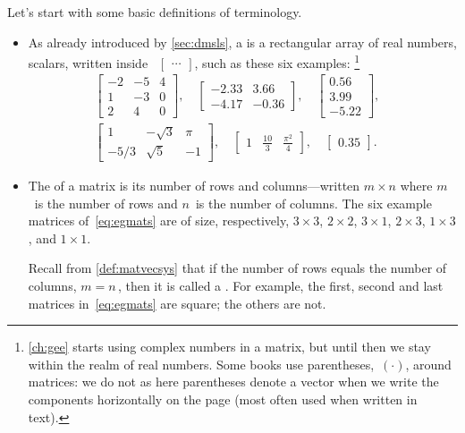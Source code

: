 Let's start with some basic definitions of terminology.
\begin{itemize}
\item As already introduced by \autoref{sec:dmsls}, a  is a rectangular array of real numbers, scalars, written inside ~\(\begin{bmatrix} \cdots  \end{bmatrix}\), such as these six examples:
\footnote{\autoref{ch:gee} starts using complex numbers in a matrix, but until then we stay within the realm of real numbers.  Some books use parentheses,~\((\cdot)\), around matrices: we do not as here parentheses denote a vector when we write the components horizontally on the page (most often used when written in text).}
\begin{align}&
\begin{bmatrix}   -2 & -5 & 4
\\ 1 & -3 & 0
\\ 2 & 4 & 0 \end{bmatrix},\quad
\begin{bmatrix}   -2.33 & 3.66
\\ -4.17 & -0.36 \end{bmatrix},\quad
\begin{bmatrix}  0.56
\\ 3.99 
\\-5.22 \end{bmatrix},\quad
\nonumber\\&
\begin{bmatrix}   1 & -\sqrt3 & \pi
\\ -5/3 & \sqrt5 & -1 \end{bmatrix},\quad
\begin{bmatrix}    1 & \frac{10}3 & \frac{\pi^2}4 \end{bmatrix},\quad
\begin{bmatrix} 0.35 \end{bmatrix}.
\qquad\label{eq:egmats}
\end{align}


\item The  of a matrix is its number of rows and columns---written \(m\times n\) where \(m\)~is the number of rows and \(n\)~is the number of columns.
The six example matrices of~\eqref{eq:egmats} are of size, respectively, \(3\times 3\), \(2\times 2\), \(3\times 1\), \(2\times 3\), \(1\times 3\), and \(1\times 1\).

Recall from \autoref{def:matvecsys} that if the number of rows equals the number of columns, \(m=n\)\,, then it is called a .
For example, the first, second and last matrices in~\eqref{eq:egmats} are square; the others are not.


\end{itemize}
